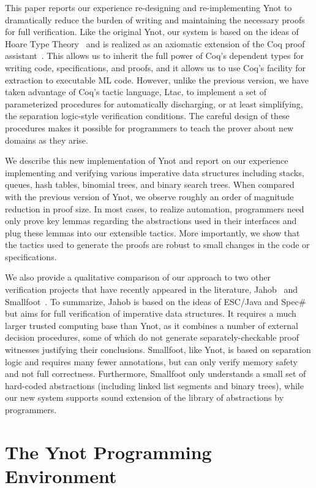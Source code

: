 \documentclass[preprint,nocopyrightspace]{sigplanconf}
\begin{document}
This paper reports our experience re-designing and re-implementing
Ynot to dramatically reduce the burden of writing and maintaining the
necessary proofs for full verification.  Like the original Ynot, our
system is based on the ideas of Hoare Type Theory~\cite{htt} and is
realized as an axiomatic extension of the Coq proof
assistant~\cite{CoqArt}.  This allows us to inherit the full power of
Coq's dependent types for writing code, specifications, and proofs,
and it allows us to use Coq's facility for extraction to executable ML
code.  However, unlike the previous version, we have taken advantage
of Coq's tactic language, Ltac, to implement a set of parameterized
procedures for automatically discharging, or at least simplifying, the
separation logic-style verification conditions.  The careful design of
these procedures makes it possible for programmers to teach the prover
about new domains as they arise.

We describe this new implementation of Ynot and report on our
experience implementing and verifying various imperative data
structures including stacks, queues, hash tables, binomial trees, and
binary search trees.  When compared with the previous version of Ynot,
we observe roughly an order of magnitude reduction in proof size.  In
most cases, to realize automation, programmers need only prove key
lemmas regarding the abstractions used in their interfaces and plug
these lemmas into our extensible tactics.  More importantly, we show
that the tactics used to generate the proofs are robust to small
changes in the code or specifications.

We also provide a qualitative comparison of our approach to two other
verification projects that have recently appeared in the literature,
Jahob~\cite{jahob} and Smallfoot~\cite{smallfoot}.  To summarize,
Jahob is based on the ideas of ESC/Java and Spec\# but aims for full
verification of imperative data structures.  It requires a much larger
trusted computing base than Ynot, as it combines a number of external
decision procedures, some of which do not generate
separately-checkable proof witnesses justifying their conclusions.
Smallfoot, like Ynot, is based on separation logic and requires many
fewer annotations, but can only verify memory safety and not full
correctness.  Furthermore, Smallfoot only understands a small set of
hard-coded abstractions (including linked list segments and binary
trees), while our new system supports sound extension of the library
of abstractions by programmers.

\section{\label{tutorial}The Ynot Programming Environment}
\end{document}
